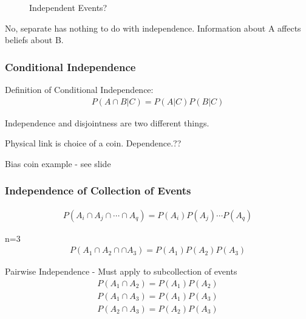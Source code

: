 \begin{figure}[ht]
\centering
{}
\caption{Independent Events?} \label{fig:M22}
\end{figure}


No, separate has nothing to do with independence.  Information about A affects beliefs about B.

\subsubsection{Conditional Independence}


Definition of Conditional Independence:
\begin{align*}
P(A \cap B | C) = P(A|C)P(B|C)
\end{align*}

 Independence and disjointness are two different things.

Physical link is choice of a coin.  Dependence.??

Bias coin example - see slide

\subsubsection{Independence of Collection of Events}


\begin{align*}
P(A_i \cap A_j \cap \cdots \cap A_q) = P(A_i)P(A_j)\cdots P(A_q)
\end{align*}

n=3
\begin{align*}
P(A_1 \cap A_2 \cap \cap A_3) = P(A_1)P(A_2)P(A_3)
\end{align*}

Pairwise Independence - Must apply to subcollection of events
\begin{align*}
P(A_1 \cap A_2 ) = P(A_1)P(A_2)\\
P(A_1 \cap A_3 ) = P(A_1)P(A_3)\\
P(A_2 \cap A_3 ) = P(A_2)P(A_3)\\
\end{align*}

